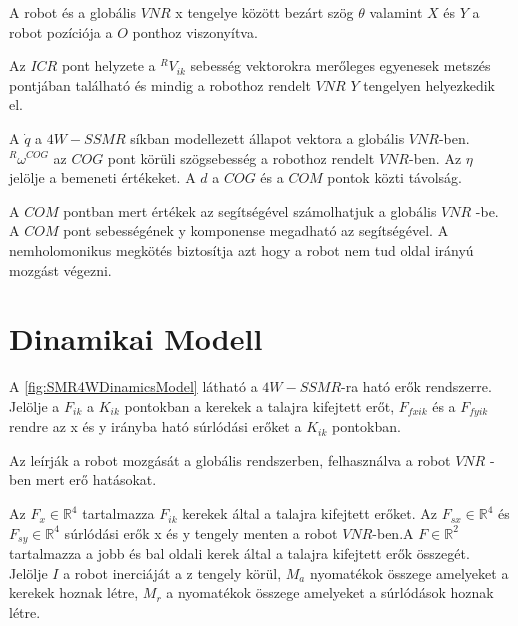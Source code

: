 A robot és a globális $VNR$ x tengelye között bezárt szög $\theta$ valamint $X$ és $Y$ a robot pozíciója a $O$ ponthoz viszonyítva.

Az $ICR$ pont helyzete a $^RV_{ik}$ sebesség vektorokra merőleges egyenesek metszés pontjában található és mindig a robothoz rendelt $VNR$ $Y$ tengelyen helyezkedik el.

\renewcommand{\img}{SajatRobot/SzerkAbrak/robot4wSebModel_seb.jpg}
\renewcommand{\sources}{*}
\renewcommand{\captionn}{Kinematikai modell az $4W-SSMR$ típusú robotnak.}
\renewcommand{\figlabel}{SMR4WKinematics}


A $\dot q$ a $4W-SSMR$ síkban modellezett állapot vektora a globális $VNR$-ben. $^R \omega^{COG}$ az $COG$ pont körüli szögsebesség a robothoz rendelt $VNR$-ben. Az $\eta$ jelölje a bemeneti értékeket.
A $d$ a $COG$ és a $COM$ pontok közti távolság.

A $COM$ pontban mert értékek az  segítségével számolhatjuk a globális $VNR$ -be.
A $COM$ pont sebességének y komponense megadható az  segítségével.
A nemholomonikus megkötés  biztosítja azt hogy a robot nem tud oldal irányú mozgást végezni.





\section{Dinamikai Modell} 

A \ref{fig:SMR4WDinamicsModel} látható a $4W-SSMR$-ra ható erők rendszerre. Jelölje a $F_{ik}$ a $K_{ik}$ pontokban a kerekek a talajra kifejtett erőt, $F_{fxik}$ és a $F_{fyik}$ rendre az x és y irányba ható súrlódási erőket a $K_{ik}$ pontokban.

Az  leírják a robot mozgását a globális rendszerben, felhasználva a robot $VNR$ - ben mert erő hatásokat.

\renewcommand{\img}{SajatRobot/SzerkAbrak/robot4wDinamic.jpg}
\renewcommand{\sources}{*}
\renewcommand{\captionn}{Kinematikai modell az $SSMR$ típusú $MR$ robotnak.}
\renewcommand{\figlabel}{SMR4WDinamicsModel}


Az $F_x \in \mathbb{R}^4$ tartalmazza $F_{ik}$ kerekek által a talajra kifejtett erőket. Az $F_{sx} \in \mathbb{R}^4$ és $F_{sy} \in \mathbb{R}^4$ súrlódási erők x és y tengely menten a robot $VNR$-ben.A $F \in \mathbb{R}^2$ tartalmazza a jobb és bal oldali kerek által a talajra kifejtett erők összegét. Jelölje $I$ a robot inerciáját a z tengely körül, $M_a$ nyomatékok összege amelyeket a kerekek hoznak létre, $M_r$ a nyomatékok összege amelyeket a súrlódások hoznak létre. 

